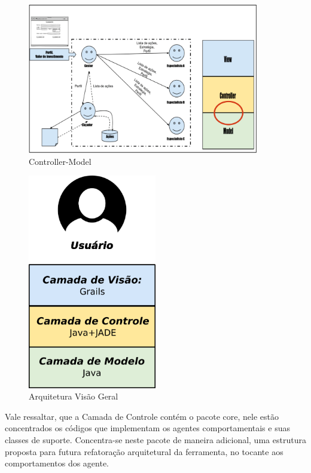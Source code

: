 \begin{figure}[H]
\centering
\label{f18}
\includegraphics[width=0.9\textwidth]{figuras/f25}
\caption{Controller-Model}
\end{figure}
\FloatBarrier

\begin{figure}[h]
\centering
\label{f19}
\includegraphics[width=0.5\textwidth]{figuras/arquiteturaVisaoGeral}
\caption{Arquitetura Visão Geral}
\end{figure}

Vale ressaltar, que a Camada de Controle contém o pacote core, nele estão concentrados os códigos que implementam os agentes comportamentais e suas classes de suporte. Concentra-se neste pacote de maneira adicional, uma estrutura proposta para futura refatoração arquitetural da ferramenta, no tocante aos comportamentos dos agente.

